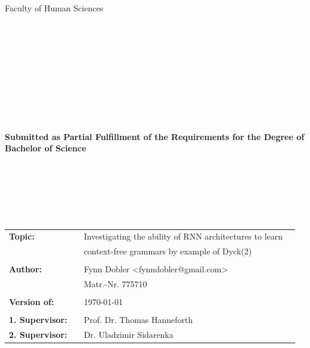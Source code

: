 \begin{center}
\Large{Faculty of Human Sciences}
\end{center}
\begin{verbatim}




\end{verbatim}
\begin{center}
\doublespacing
\textbf{\LARGE{\titleDocument}}\\
\singlespacing
\begin{verbatim}

\end{verbatim}
\textbf{{~\subjectDocument~}}
\end{center}
\begin{verbatim}

\end{verbatim}
\begin{center}

\end{center}
\begin{verbatim}

\end{verbatim}
\begin{center}
\textbf{Submitted as Partial Fulfillment of the Requirements for the Degree of \\ Bachelor of Science}
\end{center}
\begin{verbatim}






\end{verbatim}
\begin{flushleft}
\begin{tabular}{llll}
\textbf{Topic:} & & Investigating the ability of RNN architectures to learn & \\
& & context-free grammars by example of Dyck(2) & \\
& & \\
\textbf{Author:} & & Fynn Dobler <fynndobler@gmail.com>& \\
& & Matr.-Nr. 775710 & \\
& & \\
\textbf{Version of:} & & \today &\\
& & \\
\textbf{1. Supervisor:} & & Prof. Dr. Thomas Hanneforth &\\
\textbf{2. Supervisor:} & & Dr. Uladzimir Sidarenka &\\
\end{tabular}
\end{flushleft}
